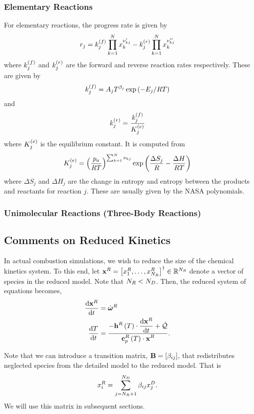 \subsubsection{Elementary Reactions}
For elementary reactions, the progress rate is given by 
\begin{align}
  r_{j} = k_{j}^{\left(f\right)}\prod_{k=1}^{N}{x_{k}^{\nu_{kj}^{\prime}}} - 
          k_{j}^{\left(r\right)}\prod_{k=1}^{N}{x_{k}^{\nu_{kj}^{\prime\prime}}}
\end{align}
where $k_{j}^{\left(f\right)}$ and $k_{j}^{\left(r\right)}$ are the forward and reverse reaction rates 
respectively.  These are given by 
\begin{align}
  k_{j}^{\left(f\right)} = A_{j}T^{\beta_{j}}\exp\left(-E_{j}/RT\right)
\end{align}
and 
\begin{align}
  k_{j}^{\left(r\right)} = \frac{k_{j}^{\left(f\right)}}{K_{j}^{\left(e\right)}}
\end{align}
where $K_{j}^{\left(e\right)}$ is the equilibrium constant.  It is computed from 
\begin{align}
  K_{j}^{\left(e\right)} = \left(\frac{p_{a}}{RT}\right)^{\sum_{k=1}^{N}{\nu_{kj}}}\exp\left(\frac{\Delta S_{j}}{R} - \frac{\Delta H}{RT}\right)
\end{align}
where $\Delta S_{j}$ and $\Delta H_{j}$ are the change in entropy and entropy 
between the products and reactants for reaction $j$.  These are usually given 
by the NASA polynomials.

\subsubsection{Unimolecular Reactions (Three-Body Reactions)}

\subsection{Comments on Reduced Kinetics}
In actual combustion simulations, we wish to reduce the size of the chemical kinetics system.  
To this end, let $\mathbf{x}^{R} = \left[x_{1}^{R}, \ldots, x_{N_{R}}^{R}\right]^{\dagger} \in \mathbb{R}^{N_{R}}$ 
denote a vector of species in the reduced model.  Note that $N_{R} < N_{D}$.  Then, the reduced 
system of equations becomes,
\begin{align}
  \frac{\mathrm{d} \mathbf{x}^{R}}{\mathrm{d} t} &= \dot{\boldsymbol{\omega}}^{R} \label{eq:reduced}\\
  \frac{\mathrm{d} T}{\mathrm{d} t}   &= \frac{\displaystyle -\mathbf{h}^{R}\left(T\right)\cdot\frac{\mathrm{d} \mathbf{x}^{R}}{\mathrm{d} t} + \dot{\mathcal{Q}}}{\displaystyle \mathbf{c}_{p}^{R}\left(T\right)\cdot\mathbf{x}^{R}}. \label{eq:reduced_T}
\end{align}

Note that we can introduce a transition matrix, $\mathbf{B} = \left[\beta_{ij}\right]$, that 
redistributes neglected species from the detailed model to the reduced model.  That is
\begin{align}
  x_{i}^{R} = \sum_{j=N_{R} + 1}^{N_{D}}{\beta_{ij}x_{j}^{D}}. \label{eq:transition}
\end{align}
We will use this matrix in subsequent sections.
